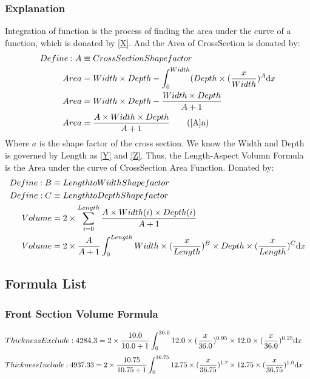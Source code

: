 \documentclass{article}%
\begin{document}
\subsubsection{Explanation}%
\label{ssubsec:Explanation}%
Integration of function is the process of finding the area under the curve of a function, which is donated by \eqref{X}. %
And the Area of CrossSection is donated by:%
\begin{align}%
Define:A &\equiv CrossSection Shape factor\notag\\%
Area &=Width\times Depth - \int_0^{Width} (Depth\times(\frac{x}{Width})^{A} \mathrm{d}x\label{A}\\%
Area &=Width\times Depth - \frac{Width\times Depth}{A + 1}\notag\\%
Area &=\frac{A\times Width\times Depth}{A + 1}\tag{\ref{A}{a}}%
\end{align}%
Where $a$ is the shape factor of the cross section.%
We know the Width and Depth is governed by Length as \eqref{Y} and \eqref{Z}.%
Thus, the Length{-}Aspect Volumn Formula is the Area under the curve of CrossSection Area Function. Donated by: %
\begin{align}%
Define: B &\equiv Length to Width Shape factor\notag\\%
Define: C &\equiv Length to Depth Shape factor\notag\\%
Volume &=2\times \displaystyle\sum_{i=0}^{Length} \frac{A\times Width(i) \times Depth(i)}{A+1}\notag\\%
Volume &=2\times \frac{A}{A+1} \int_0^{Length} Width\times(\frac{x}{Length})^{B}\times Depth\times(\frac{x}{Length})^{C} \mathrm{d}x\label{B}%
\end{align}

%
\subsection{Formula List}%
\label{subsec:FormulaList}%
\subsubsection{Front Section Volume Formula}%
\label{ssubsec:FrontSectionVolumeFormula}%
\begin{align}%
Thickness Exclude: 4284.3 &=2\times \frac{10.0}{10.0+1} \int_0^{36.0} 12.0\times(\frac{x}{36.0})^{0.95}\times 12.0\times(\frac{x}{36.0})^{0.25} \mathrm{d}x \notag%
\end{align}%
\begin{align}%
Thickness Include: 4937.33 &=2\times \frac{10.75}{10.75+1} \int_0^{36.75} 12.75\times(\frac{x}{36.75})^{1.7}\times 12.75\times(\frac{x}{36.75})^{1.0} \mathrm{d}x \notag%
\end{align}
\end{document}
